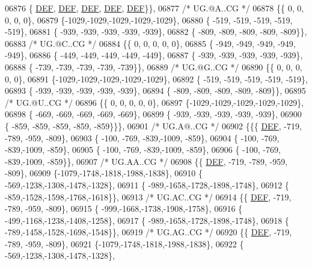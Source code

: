 \begin{DoxyCode}
06876 \{  \mbox{\hyperlink{1_88_84__epars_8h_a397419fc12b37ed479c8abb9d444d843}{DEF}},  \mbox{\hyperlink{1_88_84__epars_8h_a397419fc12b37ed479c8abb9d444d843}{DEF}},  \mbox{\hyperlink{1_88_84__epars_8h_a397419fc12b37ed479c8abb9d444d843}{DEF}},  \mbox{\hyperlink{1_88_84__epars_8h_a397419fc12b37ed479c8abb9d444d843}{DEF}},  \mbox{\hyperlink{1_88_84__epars_8h_a397419fc12b37ed479c8abb9d444d843}{DEF}}\}\},
06877 \textcolor{comment}{/* UG.@A..CG */}
06878 \{\{    0,    0,    0,    0,    0\},
06879 \{-1029,-1029,-1029,-1029,-1029\},
06880 \{ -519, -519, -519, -519, -519\},
06881 \{ -939, -939, -939, -939, -939\},
06882 \{ -809, -809, -809, -809, -809\}\},
06883 \textcolor{comment}{/* UG.@C..CG */}
06884 \{\{    0,    0,    0,    0,    0\},
06885 \{ -949, -949, -949, -949, -949\},
06886 \{ -449, -449, -449, -449, -449\},
06887 \{ -939, -939, -939, -939, -939\},
06888 \{ -739, -739, -739, -739, -739\}\},
06889 \textcolor{comment}{/* UG.@G..CG */}
06890 \{\{    0,    0,    0,    0,    0\},
06891 \{-1029,-1029,-1029,-1029,-1029\},
06892 \{ -519, -519, -519, -519, -519\},
06893 \{ -939, -939, -939, -939, -939\},
06894 \{ -809, -809, -809, -809, -809\}\},
06895 \textcolor{comment}{/* UG.@U..CG */}
06896 \{\{    0,    0,    0,    0,    0\},
06897 \{-1029,-1029,-1029,-1029,-1029\},
06898 \{ -669, -669, -669, -669, -669\},
06899 \{ -939, -939, -939, -939, -939\},
06900 \{ -859, -859, -859, -859, -859\}\}\},
06901 \textcolor{comment}{/* UG.A@..CG */}
06902 \{\{\{  \mbox{\hyperlink{1_88_84__epars_8h_a397419fc12b37ed479c8abb9d444d843}{DEF}}, -719, -789, -959, -809\},
06903 \{ -100, -769, -839,-1009, -859\},
06904 \{ -100, -769, -839,-1009, -859\},
06905 \{ -100, -769, -839,-1009, -859\},
06906 \{ -100, -769, -839,-1009, -859\}\},
06907 \textcolor{comment}{/* UG.AA..CG */}
06908 \{\{  \mbox{\hyperlink{1_88_84__epars_8h_a397419fc12b37ed479c8abb9d444d843}{DEF}}, -719, -789, -959, -809\},
06909 \{-1079,-1748,-1818,-1988,-1838\},
06910 \{ -569,-1238,-1308,-1478,-1328\},
06911 \{ -989,-1658,-1728,-1898,-1748\},
06912 \{ -859,-1528,-1598,-1768,-1618\}\},
06913 \textcolor{comment}{/* UG.AC..CG */}
06914 \{\{  \mbox{\hyperlink{1_88_84__epars_8h_a397419fc12b37ed479c8abb9d444d843}{DEF}}, -719, -789, -959, -809\},
06915 \{ -999,-1668,-1738,-1908,-1758\},
06916 \{ -499,-1168,-1238,-1408,-1258\},
06917 \{ -989,-1658,-1728,-1898,-1748\},
06918 \{ -789,-1458,-1528,-1698,-1548\}\},
06919 \textcolor{comment}{/* UG.AG..CG */}
06920 \{\{  \mbox{\hyperlink{1_88_84__epars_8h_a397419fc12b37ed479c8abb9d444d843}{DEF}}, -719, -789, -959, -809\},
06921 \{-1079,-1748,-1818,-1988,-1838\},
06922 \{ -569,-1238,-1308,-1478,-1328\},

\end{DoxyCode}
